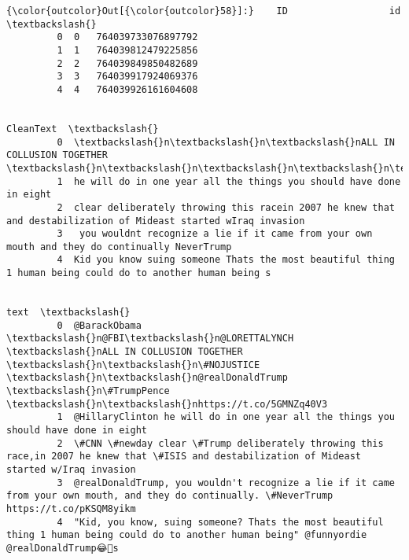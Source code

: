 \documentclass[11pt]{article}
\begin{document}
\begin{Verbatim}[commandchars=\\\{\}]
{\color{outcolor}Out[{\color{outcolor}58}]:}    ID                  id  \textbackslash{}
         0  0   764039733076897792   
         1  1   764039812479225856   
         2  2   764039849850482689   
         3  3   764039917924069376   
         4  4   764039926161604608   
         
                                                                                                                  CleanText  \textbackslash{}
         0  \textbackslash{}n\textbackslash{}n\textbackslash{}nALL IN COLLUSION TOGETHER \textbackslash{}n\textbackslash{}n\textbackslash{}n\textbackslash{}n\textbackslash{}n\textbackslash{}n\textbackslash{}nhttpstco5GMNZq40V3                                                  
         1  he will do in one year all the things you should have done in eight                                               
         2  clear deliberately throwing this racein 2007 he knew that and destabilization of Mideast started wIraq invasion   
         3   you wouldnt recognize a lie if it came from your own mouth and they do continually NeverTrump                    
         4  Kid you know suing someone Thats the most beautiful thing 1 human being could do to another human being s         
         
                                                                                                                                                    text  \textbackslash{}
         0  @BarackObama \textbackslash{}n@FBI\textbackslash{}n@LORETTALYNCH \textbackslash{}nALL IN COLLUSION TOGETHER \textbackslash{}n\textbackslash{}n\#NOJUSTICE \textbackslash{}n\textbackslash{}n@realDonaldTrump \textbackslash{}n\#TrumpPence \textbackslash{}n\textbackslash{}nhttps://t.co/5GMNZq40V3   
         1  @HillaryClinton he will do in one year all the things you should have done in eight                                                            
         2  \#CNN \#newday clear \#Trump deliberately throwing this race,in 2007 he knew that \#ISIS and destabilization of Mideast started w/Iraq invasion    
         3  @realDonaldTrump, you wouldn't recognize a lie if it came from your own mouth, and they do continually. \#NeverTrump https://t.co/pKSQM8yikm    
         4  "Kid, you know, suing someone? Thats the most beautiful thing 1 human being could do to another human being" @funnyordie @realDonaldTrump😂💩s   
         

\end{Verbatim}
\end{document}
